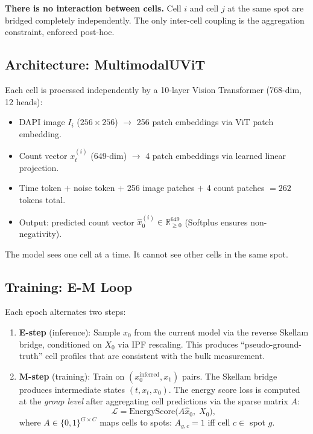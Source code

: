 \documentclass[11pt]{article}
\begin{document}
\textbf{There is no interaction between cells.} Cell $i$ and cell $j$ at the same spot are bridged completely independently. The only inter-cell coupling is the aggregation constraint, enforced post-hoc.

\subsection{Architecture: MultimodalUViT}

Each cell is processed independently by a 10-layer Vision Transformer (768-dim, 12 heads):
\begin{itemize}
  \item DAPI image $I_i$ ($256 \times 256$) $\to$ 256 patch embeddings via ViT patch embedding.
  \item Count vector $x_t^{(i)}$ (649-dim) $\to$ 4 patch embeddings via learned linear projection.
  \item Time token $+$ noise token $+$ 256 image patches $+$ 4 count patches $= 262$ tokens total.
  \item Output: predicted count vector $\hat{x}_0^{(i)} \in \mathbb{R}_{\geq 0}^{649}$ (Softplus ensures non-negativity).
\end{itemize}

The model sees one cell at a time. It cannot see other cells in the same spot.

\subsection{Training: E-M Loop}

Each epoch alternates two steps:
\begin{enumerate}
  \item \textbf{E-step} (inference): Sample $x_0$ from the current model via the reverse Skellam bridge, conditioned on $X_0$ via IPF rescaling. This produces ``pseudo-ground-truth'' cell profiles that are consistent with the bulk measurement.
  \item \textbf{M-step} (training): Train on $(x_0^{\text{inferred}}, x_1)$ pairs. The Skellam bridge produces intermediate states $(t, x_t, x_0)$. The energy score loss is computed at the \emph{group level} after aggregating cell predictions via the sparse matrix $A$:
  \[
    \mathcal{L} = \text{EnergyScore}\!\bigl(A \hat{x}_0,\; X_0\bigr),
  \]
  where $A \in \{0,1\}^{G \times C}$ maps cells to spots: $A_{g,c} = 1$ iff cell $c \in$ spot $g$.
\end{enumerate}
\end{document}
